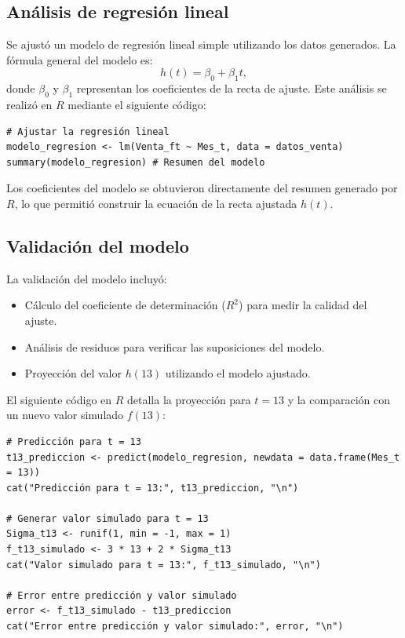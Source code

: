 \documentclass[a4paper,12pt]{article}
\begin{document}
\subsection{Análisis de regresión lineal}

Se ajustó un modelo de regresión lineal simple utilizando los datos generados. La fórmula general del modelo es:
\[
h(t) = \beta_0 + \beta_1 t,
\]
donde \( \beta_0 \) y \( \beta_1 \) representan los coeficientes de la recta de ajuste. Este análisis se realizó en \( R \) mediante el siguiente código:

\begin{verbatim}
# Ajustar la regresión lineal
modelo_regresion <- lm(Venta_ft ~ Mes_t, data = datos_venta)
summary(modelo_regresion) # Resumen del modelo
\end{verbatim}

Los coeficientes del modelo se obtuvieron directamente del resumen generado por \( R \), lo que permitió construir la ecuación de la recta ajustada \( h(t) \).

\subsection{Validación del modelo}

La validación del modelo incluyó:
\begin{itemize}
    \item Cálculo del coeficiente de determinación (\( R^2 \)) para medir la calidad del ajuste.
    \item Análisis de residuos para verificar las suposiciones del modelo.
    \item Proyección del valor \( h(13) \) utilizando el modelo ajustado.
\end{itemize}

El siguiente código en \( R \) detalla la proyección para \( t = 13 \) y la comparación con un nuevo valor simulado \( f(13) \):

\begin{verbatim}
# Predicción para t = 13
t13_prediccion <- predict(modelo_regresion, newdata = data.frame(Mes_t = 13))
cat("Predicción para t = 13:", t13_prediccion, "\n")

# Generar valor simulado para t = 13
Sigma_t13 <- runif(1, min = -1, max = 1)
f_t13_simulado <- 3 * 13 + 2 * Sigma_t13
cat("Valor simulado para t = 13:", f_t13_simulado, "\n")

# Error entre predicción y valor simulado
error <- f_t13_simulado - t13_prediccion
cat("Error entre predicción y valor simulado:", error, "\n")
\end{verbatim}
\end{document}
